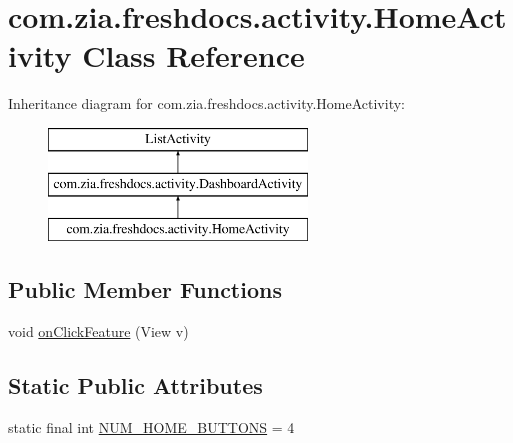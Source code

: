 \hypertarget{classcom_1_1zia_1_1freshdocs_1_1activity_1_1_home_activity}{\section{com.\-zia.\-freshdocs.\-activity.\-Home\-Activity Class Reference}
\label{classcom_1_1zia_1_1freshdocs_1_1activity_1_1_home_activity}
}
Inheritance diagram for com.\-zia.\-freshdocs.\-activity.\-Home\-Activity\-:\begin{figure}[H]
\begin{center}
\leavevmode
\includegraphics[height=3.000000cm]{classcom_1_1zia_1_1freshdocs_1_1activity_1_1_home_activity}
\end{center}
\end{figure}
\subsection*{Public Member Functions}
\begin{DoxyCompactItemize}
\item 
void \hyperlink{classcom_1_1zia_1_1freshdocs_1_1activity_1_1_home_activity_abe03d3da96b4da3bff80ad78af579f6e}{on\-Click\-Feature} (View v)
\end{DoxyCompactItemize}
\subsection*{Static Public Attributes}
\begin{DoxyCompactItemize}
\item 
static final int \hyperlink{classcom_1_1zia_1_1freshdocs_1_1activity_1_1_home_activity_a06d4f0c3f8ab0dff29f4408bb3f35a9d}{N\-U\-M\-\_\-\-H\-O\-M\-E\-\_\-\-B\-U\-T\-T\-O\-N\-S} = 4
\end{DoxyCompactItemize}
